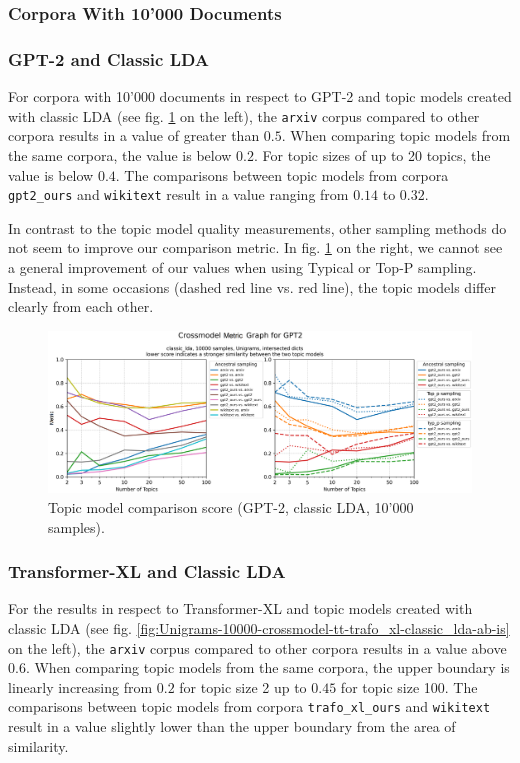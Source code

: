 \subsubsection{Corpora With 10'000 Documents}
\subsubsection{GPT-2 and Classic LDA}
For corpora with 10'000 documents in respect to GPT-2 and topic models created with classic LDA (see fig. \ref{fig:Unigrams-10000-crossmodel-tt-gpt2-classic_lda-ab-is} on the left), the \texttt{arxiv} corpus compared to other corpora results in a value of greater than $0.5$. When comparing topic models from the same corpora, the value is below $0.2$. For topic sizes of up to 20 topics, the value is below $0.4$. The comparisons between topic models from corpora \texttt{gpt2\_ours} and \texttt{wikitext} result in a value ranging from $0.14$ to $0.32$.

In contrast to the topic model quality measurements, other sampling methods do not seem to improve our comparison metric. In fig. \ref{fig:Unigrams-10000-crossmodel-tt-gpt2-classic_lda-ab-is} on the right, we cannot see a general improvement of our values when using Typical or Top-P sampling. Instead, in some occasions (dashed red line vs. red line), the topic models differ clearly from each other.
\begin{figure}[H]
    \centering
    \includegraphics[width=1\textwidth]{figures/Unigrams-10000-crossmodel-tt-gpt2-classic_lda-ab-is}
    \caption{Topic model comparison score (GPT-2, classic LDA, 10'000 samples).}
    \label{fig:Unigrams-10000-crossmodel-tt-gpt2-classic_lda-ab-is}
\end{figure}

\subsubsection{Transformer-XL and Classic LDA}
For the results in respect to Transformer-XL and topic models created with classic LDA (see fig. \ref{fig:Unigrams-10000-crossmodel-tt-trafo_xl-classic_lda-ab-is} on the left), the \texttt{arxiv} corpus compared to other corpora results in a value above $0.6$. When comparing topic models from the same corpora, the upper boundary is linearly increasing from $0.2$ for topic size 2 up to $0.45$ for topic size 100. The comparisons between topic models from corpora \texttt{trafo\_xl\_ours} and \texttt{wikitext} result in a value slightly lower than the upper boundary from the area of similarity.

